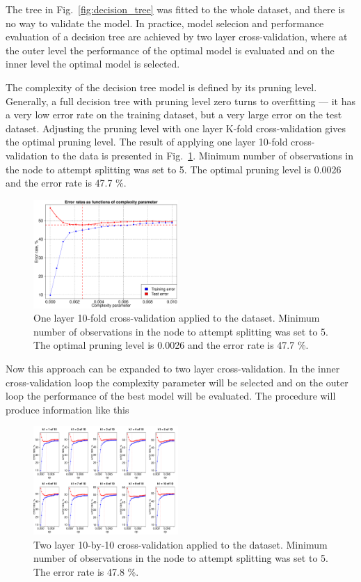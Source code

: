 \documentclass[10pt, paper=a4]{article}
\begin{document}
The tree in Fig.~\ref{fig:decision_tree} was fitted to the whole
dataset, and there is no way to validate the model.  In practice,
model selecion and performance evaluation of a decision tree are
achieved by two layer cross-validation, where at the outer level the
performance of the optimal model is evaluated and on the inner level
the optimal model is selected.

The complexity of the decision tree model is defined by its pruning
level.  Generally, a full decision tree with pruning level zero turns
to overfitting --- it has a very low error rate on the training
dataset, but a very large error on the test dataset.  Adjusting the
pruning level with one layer K-fold cross-validation gives the optimal
pruning level.  The result of applying one layer 10-fold
cross-validation to the data is presented in Fig.~\ref{fig:cv_1}.
Minimum number of observations in the node to attempt splitting was
set to 5.  The optimal pruning level is 0.0026 and the error rate is
47.7 \%.

\begin{figure}[htbp]
  \centering
  \includegraphics[width = 0.49\textwidth]{decision_tree_err_CV1.pdf}
  \caption{One layer 10-fold cross-validation applied to the
    dataset. Minimum number of observations in the node to attempt
    splitting was set to 5.  The optimal pruning level is 0.0026 and
    the error rate is 47.7 \%.}
  \label{fig:cv_1}
\end{figure}

Now this approach can be expanded to two layer cross-validation. In
the inner cross-validation loop the complexity parameter will be
selected and on the outer loop the performance of the best model will
be evaluated.  The procedure will produce information like this

\begin{figure}[htbp]
  \centering
  \includegraphics[width = 0.49\textwidth]{decision_tree_err_CV2.pdf}
  \caption{Two layer 10-by-10 cross-validation applied to the
    dataset. Minimum number of observations in the node to attempt
    splitting was set to 5.  The error rate is 47.8 \%.}
  \label{fig:cv_2}
\end{figure}
\end{document}
